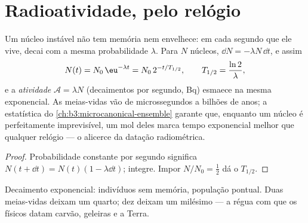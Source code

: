 \section{Radioatividade, pelo relógio}

\begin{theorem}\label{thm:b3:nuclear-physics:decay}
Um núcleo instável não tem memória nem envelhece: em cada segundo que
ele vive, decai com a mesma probabilidade $\lambda$. Para $N$
núcleos, $\dd N = -\lambda N\,\dd t$, e assim
\[
N(t) = N_0\,\eu^{-\lambda t} = N_0\,2^{-t/T_{1/2}} ,
\qquad T_{1/2} = \frac{\ln2}{\lambda} ,
\]
e a \emph{atividade} $\mathcal A = \lambda N$ (decaimentos por
segundo, \unit{Bq}) esmaece na mesma exponencial. As meias-vidas vão
de microssegundos a bilhões de anos; a estatística do
\cref{ch:b3:microcanonical-ensemble} garante que, enquanto um
núcleo é perfeitamente imprevisível, um mol deles marca tempo
exponencial melhor que qualquer relógio --- o alicerce da
datação radiométrica.
\end{theorem}

\begin{proof}
Probabilidade constante por segundo significa $N(t + \dd t) = N(t)(1 -
\lambda\dd t)$; integre. Impor $N/N_0 = \tfrac12$ dá o
$T_{1/2}$.
\end{proof}

\begin{omfigure}

{\small Decaimento exponencial: indivíduos sem memória, população
pontual. Duas meias-vidas deixam um quarto; dez deixam um
milésimo --- a régua com que os físicos datam carvão,
geleiras e a Terra.}
\end{omfigure}

